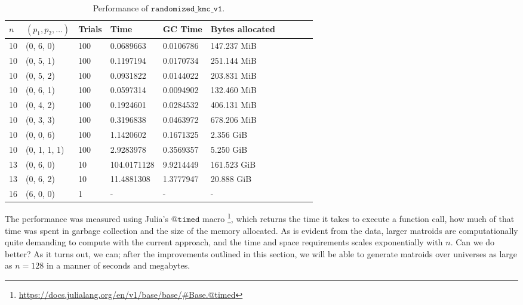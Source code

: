 \begin{table*}[ht!]
  \centering
  \caption{Performance of $\texttt{randomized\_kmc\_v1}$.}
  \label{tab:perf_v1}
  \begin{threeparttable}
    \begin{tabular}{llllllllll}
      \toprule
      $n$ & $(p_1, p_2, \ldots)$ & Trials & Time  & GC Time & Bytes allocated \\
      \midrule
        10 & (0, 6, 0)    & 100 & 0.0689663   & 0.0106786 & 147.237 MiB \\
        10 & (0, 5, 1)    & 100 & 0.1197194   & 0.0170734 & 251.144 MiB \\
        10 & (0, 5, 2)    & 100 & 0.0931822   & 0.0144022 & 203.831 MiB \\
        10 & (0, 6, 1)    & 100 & 0.0597314   & 0.0094902 & 132.460 MiB \\
        10 & (0, 4, 2)    & 100 & 0.1924601   & 0.0284532 & 406.131 MiB \\
        10 & (0, 3, 3)    & 100 & 0.3196838   & 0.0463972 & 678.206 MiB \\
        10 & (0, 0, 6)    & 100 & 1.1420602   & 0.1671325 & 2.356 GiB   \\
        10 & (0, 1, 1, 1) & 100 & 2.9283978   & 0.3569357 & 5.250 GiB   \\
        13 & (0, 6, 0)    & 10  & 104.0171128 & 9.9214449 & 161.523 GiB \\
        13 & (0, 6, 2)    & 10  & 11.4881308  & 1.3777947 & 20.888 GiB  \\
        16 & (6, 0, 0)    & 1   & -           & -         & -           \\
      \bottomrule
    \end{tabular}
  \end{threeparttable}
\end{table*}

The performance was measured using Julia's $\texttt{@timed}$ macro \footnote{\href{https://docs.julialang.org/en/v1/base/base/\#Base.@timed}{https://docs.julialang.org/en/v1/base/base/\#Base.@timed}}, which returns the time it takes to execute a function call, how much of that time was spent in garbage collection and the size of the memory allocated. As is evident from the data, larger matroids are computationally quite demanding to compute with the current approach, and the time and space requirements scales exponentially with $n$. Can we do better? As it turns out, we can; after the improvements outlined in this section, we will be able to generate matroids over universes as large as $n=128$ in a manner of seconds and megabytes.

